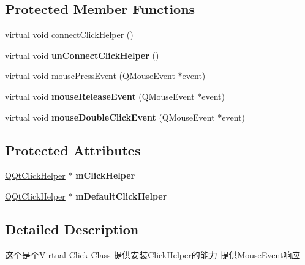 \subsection*{Protected Member Functions}
\begin{DoxyCompactItemize}
\item 
virtual void \mbox{\hyperlink{class_q_qt_virtual_click_label_a6e008887a4f2d5287e329a53caf8222c}{connect\+Click\+Helper}} ()
\item 
\mbox{\label{class_q_qt_virtual_click_label_a41214a3d8a2bbf75420246c428b196ba}} 
virtual void {\bfseries un\+Connect\+Click\+Helper} ()
\item 
virtual void \mbox{\hyperlink{class_q_qt_virtual_click_label_a86608b546a91196c9d31c46ccd50f3a1}{mouse\+Press\+Event}} (Q\+Mouse\+Event $\ast$event)
\item 
\mbox{\label{class_q_qt_virtual_click_label_af31024d0a6911d451cfd4db55e71f31b}} 
virtual void {\bfseries mouse\+Release\+Event} (Q\+Mouse\+Event $\ast$event)
\item 
\mbox{\label{class_q_qt_virtual_click_label_aa851d7ea96d829d7a2c0b34cd4d826da}} 
virtual void {\bfseries mouse\+Double\+Click\+Event} (Q\+Mouse\+Event $\ast$event)
\end{DoxyCompactItemize}
\subsection*{Protected Attributes}
\begin{DoxyCompactItemize}
\item 
\mbox{\label{class_q_qt_virtual_click_label_af91317674d4c410632f652038572049c}} 
\mbox{\hyperlink{class_q_qt_click_helper}{Q\+Qt\+Click\+Helper}} $\ast$ {\bfseries m\+Click\+Helper}
\item 
\mbox{\label{class_q_qt_virtual_click_label_a00045a066d4ee71cceaa7a26d0d5021f}} 
\mbox{\hyperlink{class_q_qt_click_helper}{Q\+Qt\+Click\+Helper}} $\ast$ {\bfseries m\+Default\+Click\+Helper}
\end{DoxyCompactItemize}


\subsection{Detailed Description}
这个是个\+Virtual Click Class 提供安装\+Click\+Helper的能力 提供\+Mouse\+Event响应

